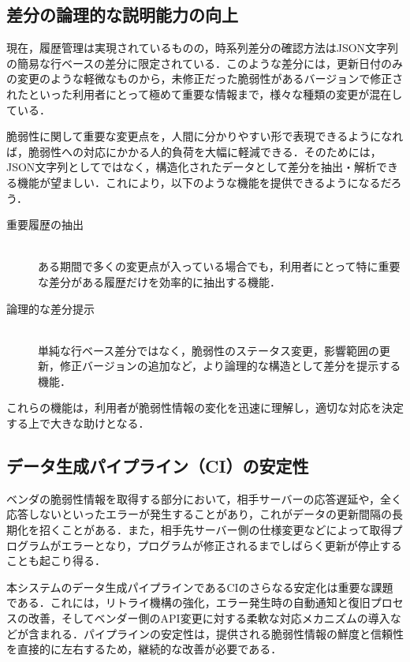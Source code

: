 \subsection{差分の論理的な説明能力の向上}
現在，履歴管理は実現されているものの，時系列差分の確認方法はJSON文字列の簡易な行ベースの差分に限定されている．このような差分には，更新日付のみの変更のような軽微なものから，未修正だった脆弱性があるバージョンで修正されたといった利用者にとって極めて重要な情報まで，様々な種類の変更が混在している．

脆弱性に関して重要な変更点を，人間に分かりやすい形で表現できるようになれば，脆弱性への対応にかかる人的負荷を大幅に軽減できる．そのためには，JSON文字列としてではなく，構造化されたデータとして差分を抽出・解析できる機能が望ましい．これにより，以下のような機能を提供できるようになるだろう．
\begin{description}
  \item[重要履歴の抽出] \mbox{} \\
    ある期間で多くの変更点が入っている場合でも，利用者にとって特に重要な差分がある履歴だけを効率的に抽出する機能．
  \item[論理的な差分提示] \mbox{} \\
    単純な行ベース差分ではなく，脆弱性のステータス変更，影響範囲の更新，修正バージョンの追加など，より論理的な構造として差分を提示する機能．
\end{description}

これらの機能は，利用者が脆弱性情報の変化を迅速に理解し，適切な対応を決定する上で大きな助けとなる．

\subsection{データ生成パイプライン（CI）の安定性}
ベンダの脆弱性情報を取得する部分において，相手サーバーの応答遅延や，全く応答しないといったエラーが発生することがあり，これがデータの更新間隔の長期化を招くことがある．また，相手先サーバー側の仕様変更などによって取得プログラムがエラーとなり，プログラムが修正されるまでしばらく更新が停止することも起こり得る．

本システムのデータ生成パイプラインであるCIのさらなる安定化は重要な課題である．これには，リトライ機構の強化，エラー発生時の自動通知と復旧プロセスの改善，そしてベンダー側のAPI変更に対する柔軟な対応メカニズムの導入などが含まれる．パイプラインの安定性は，提供される脆弱性情報の鮮度と信頼性を直接的に左右するため，継続的な改善が必要である．
